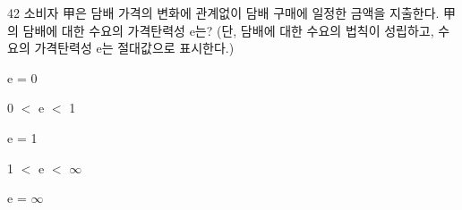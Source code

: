 \begin{question}{42}
소비자 甲은 담배 가격의 변화에 관계없이 담배 구매에 일정한 금액을 지출한다. 甲의 담배에 대한 수요의 가격탄력성 e는? (단, 담배에 대한 수요의 법칙이 성립하고, 수요의 가격탄력성 e는 절대값으로 표시한다.)
\begin{choices}
  \item e = 0
  \item 0 $<$ e $<$ 1
  \item e = 1
  \item 1 $<$ e $<$ $\infty$
  \item e = $\infty$
\end{choices}
\end{question}
